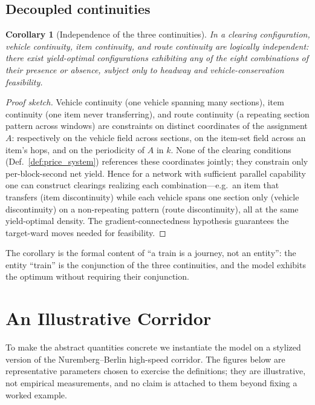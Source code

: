 \documentclass[11pt,twocolumn,a4paper]{article}
\newtheorem{corollary}[theorem]{Corollary}
\theoremstyle{definition}
\theoremstyle{remark}
\begin{document}
\subsection{Decoupled continuities}

\begin{corollary}[Independence of the three continuities]
\label{cor:decouple}
In a clearing configuration, vehicle continuity, item continuity, and route continuity are logically independent: there exist yield-optimal configurations exhibiting any of the eight combinations of their presence or absence, subject only to headway and vehicle-conservation feasibility.
\end{corollary}

\begin{proof}[Proof sketch]
Vehicle continuity (one vehicle spanning many sections), item continuity (one item never transferring), and route continuity (a repeating section pattern across windows) are constraints on distinct coordinates of the assignment $A$: respectively on the vehicle field across sections, on the item-set field across an item's hops, and on the periodicity of $A$ in $k$. None of the clearing conditions (Def.~\ref{def:price_system}) references these coordinates jointly; they constrain only per-block-second net yield. Hence for a network with sufficient parallel capability one can construct clearings realizing each combination---e.g.\ an item that transfers (item discontinuity) while each vehicle spans one section only (vehicle discontinuity) on a non-repeating pattern (route discontinuity), all at the same yield-optimal density. The gradient-connectedness hypothesis guarantees the target-ward moves needed for feasibility.
\end{proof}

The corollary is the formal content of ``a train is a journey, not an entity'': the entity ``train'' is the conjunction of the three continuities, and the model exhibits the optimum without requiring their conjunction.

\section{An Illustrative Corridor}
\label{sec:example}

To make the abstract quantities concrete we instantiate the model on a stylized version of the Nuremberg--Berlin high-speed corridor. The figures below are representative parameters chosen to exercise the definitions; they are illustrative, not empirical measurements, and no claim is attached to them beyond fixing a worked example.
\end{document}
